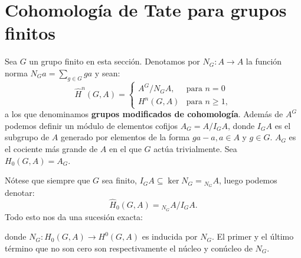 \documentclass[a4paper,12pt, leqno]{article}
\begin{document}
\section{Cohomología de Tate para grupos finitos}
Sea $G$ un grupo finito en esta sección. Denotamos por $N_G: A \rightarrow A$ la función norma $N_G a = \sum_{g \in G}ga$ y sean:
  \[
\hat{H}^n(G,A) =\left\{ \begin{array}{lr}
A^G/N_GA, & \text{para } n= 0\\
H^n(G,A) & \text{para } n\geq 1,
\end{array}\right.
\]
a los que denominamos \textbf{grupos modificados de cohomología}. Además de $A^G$ podemos definir un módulo de elementos cofijos $A_G=A / I_GA$, donde $I_GA$ es el subgrupo de $A$ generado por elementos de la forma $ga-a,a\in A$ y $g\in G$. $A_G$ es el cociente más grande de $A$ en el que $G$ actúa trivialmente. Sea $H_0(G,A)=A_G$.

Nótese que siempre que $G$ sea finito, $I_GA\subseteq \ker N_G = {}_{N_G}A$, luego podemos denotar:
\begin{equation*}
\hat{H}_0(G,A)={}_{N_G}A/I_GA.
\end{equation*}
Todo esto nos da una sucesión exacta:
\begin{center}
\end{center}
donde $N_G:H_0(G,A)\rightarrow H^0(G,A)$ es inducida por $N_G$. El primer y el último término que no son cero son respectivamente el núcleo y conúcleo de $N_G$.
\end{document}
